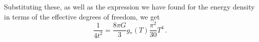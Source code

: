\documentclass[main.tex]{subfiles}
\begin{document}




Substituting these, as well as the expression we have found for the energy density in terms of the effective degrees of freedom, we get
%
\begin{equation}
  \frac{1}{4 t^2} = \frac{8 \pi G}{3} g_{*} (T) \frac{\pi^2}{30} T^{4}
\,.
\end{equation}
%


\end{document}
